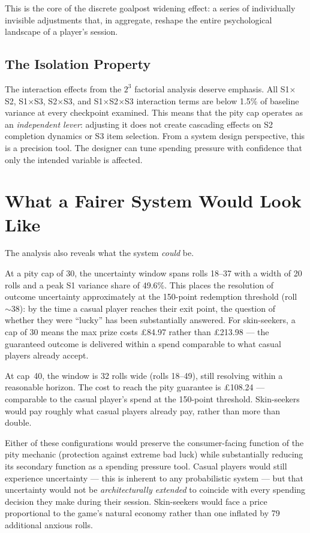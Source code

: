 \documentclass[11pt, a4paper]{article}
\begin{document}
This is the core of the discrete goalpost widening effect: a series
of individually invisible adjustments that, in aggregate, reshape the
entire psychological landscape of a player's session.


\subsection{The Isolation Property}
\label{sec:synthesis-isolation}

The interaction effects from the $2^3$ factorial analysis deserve
emphasis. All S1$\times$S2, S1$\times$S3, S2$\times$S3, and
S1$\times$S2$\times$S3 interaction terms are below 1.5\% of
baseline variance at every checkpoint examined. This means that the
pity cap operates as an \emph{independent lever}: adjusting it does
not create cascading effects on S2 completion dynamics or S3 item
selection. From a system design perspective, this is a precision tool.
The designer can tune spending pressure with confidence that only the
intended variable is affected.


\section{What a Fairer System Would Look Like}
\label{sec:fair}

The analysis also reveals what the system \emph{could} be.

At a pity cap of 30, the uncertainty window spans rolls 18--37 with a
width of 20 rolls and a peak S1 variance share of 49.6\%. This places
the resolution of outcome uncertainty approximately at the 150-point
redemption threshold (roll~$\sim$38): by the time a casual player
reaches their exit point, the question of whether they were ``lucky''
has been substantially answered. For skin-seekers, a cap of 30 means
the max prize costs \pounds84.97 rather than \pounds213.98 --- the
guaranteed outcome is delivered within a spend comparable to what
casual players already accept.

At cap~40, the window is 32 rolls wide (rolls 18--49), still
resolving within a reasonable horizon. The cost to reach the pity
guarantee is \pounds108.24 --- comparable to the casual player's
spend at the 150-point threshold. Skin-seekers would pay roughly
what casual players already pay, rather than more than double.

Either of these configurations would preserve the consumer-facing
function of the pity mechanic (protection against extreme bad luck)
while substantially reducing its secondary function as a spending
pressure tool. Casual players would still experience uncertainty ---
this is inherent to any probabilistic system --- but that uncertainty
would not be \emph{architecturally extended} to coincide with every
spending decision they make during their session. Skin-seekers would
face a price proportional to the game's natural economy rather than
one inflated by 79 additional anxious rolls.
\end{document}
